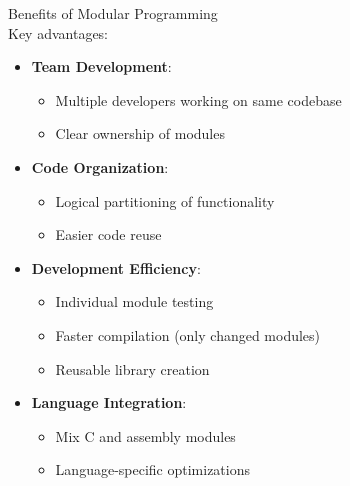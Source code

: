 \begin{definition}{Benefits of Modular Programming}\\
Key advantages:
\begin{itemize}
  \item \textbf{Team Development}:
    \begin{itemize}
      \item Multiple developers working on same codebase
      \item Clear ownership of modules
    \end{itemize}
  \item \textbf{Code Organization}:
    \begin{itemize}
      \item Logical partitioning of functionality
      \item Easier code reuse
    \end{itemize}
  \item \textbf{Development Efficiency}:
    \begin{itemize}
      \item Individual module testing
      \item Faster compilation (only changed modules)
      \item Reusable library creation
    \end{itemize}
  \item \textbf{Language Integration}:
    \begin{itemize}
      \item Mix C and assembly modules
      \item Language-specific optimizations
    \end{itemize}
\end{itemize}
\end{definition}

